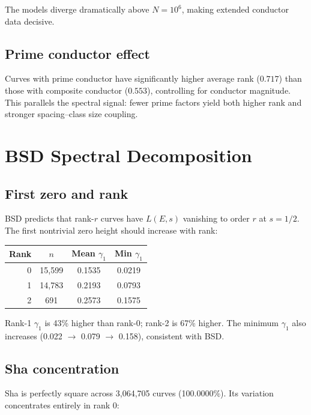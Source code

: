 \documentclass[11pt,a4paper]{article}
\begin{document}
The models diverge dramatically above $N = 10^6$, making extended conductor data decisive.

\subsection{Prime conductor effect}

Curves with prime conductor have significantly higher average rank ($0.717$) than those with composite conductor ($0.553$), controlling for conductor magnitude. This parallels the spectral signal: fewer prime factors yield both higher rank and stronger spacing--class size coupling.

\section{BSD Spectral Decomposition}
\label{sec:bsd_spectral}

\subsection{First zero and rank}

BSD predicts that rank-$r$ curves have $L(E,s)$ vanishing to order $r$ at $s = 1/2$. The first nontrivial zero height should increase with rank:

\begin{center}
\begin{tabular}{rccc}
\toprule
\textbf{Rank} & \textbf{$n$} & \textbf{Mean $\gamma_1$} & \textbf{Min $\gamma_1$} \\
\midrule
0 & 15,599 & 0.1535 & 0.0219 \\
1 & 14,783 & 0.2193 & 0.0793 \\
2 & 691 & 0.2573 & 0.1575 \\
\bottomrule
\end{tabular}
\end{center}

Rank-1 $\gamma_1$ is 43\% higher than rank-0; rank-2 is 67\% higher. The minimum $\gamma_1$ also increases (0.022 $\to$ 0.079 $\to$ 0.158), consistent with BSD.

\subsection{Sha concentration}

Sha is perfectly square across 3,064,705 curves (100.0000\%). Its variation concentrates entirely in rank 0:
\end{document}

